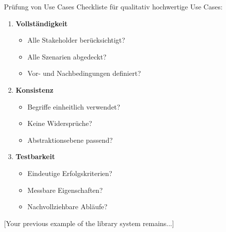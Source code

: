 \begin{KR}{Prüfung von Use Cases}
Checkliste für qualitativ hochwertige Use Cases:
\begin{enumerate}
    \item \textbf{Vollständigkeit}
    \begin{itemize}
        \item Alle Stakeholder berücksichtigt?
        \item Alle Szenarien abgedeckt?
        \item Vor- und Nachbedingungen definiert?
    \end{itemize}
    \item \textbf{Konsistenz}
    \begin{itemize}
        \item Begriffe einheitlich verwendet?
        \item Keine Widersprüche?
        \item Abstraktionsebene passend?
    \end{itemize}
    \item \textbf{Testbarkeit}
    \begin{itemize}
        \item Eindeutige Erfolgskriterien?
        \item Messbare Eigenschaften?
        \item Nachvollziehbare Abläufe?
    \end{itemize}
\end{enumerate}
\end{KR}

[Your previous example of the library system remains...]